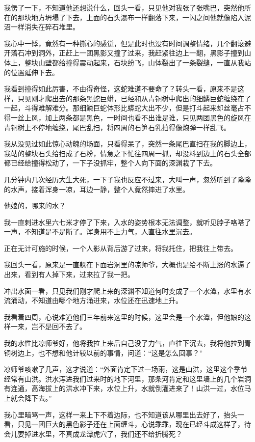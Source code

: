 我愣了一下，不知道他还想说什么，回头一看，只见他对我张了张嘴巴，突然他所在的那块地方坍塌了下去，上面的石头瀑布一样翻落下来，一闪之间他就像陷入泥沼一样消失在碎石堆里。

我心中一悸，竟然有一种撕心的感觉，但是此时也没有时间调整情绪，几个翻滚避开落石冲到洞外，正赶上一团黑影又撞了过来，我赶紧往边上一翻，黑影子撞到山体上，整块山壁都给撞得震动起来，石块纷飞，山体裂出了一条裂缝，一直从我站的位置延伸下去。

我看到撞得如此厉害，不由得奇怪，这蛇难道不要命了？转头一看，原来不是这样，只见刚才爬出去的那条黑蛇巨蟒，已经和从青铜树中爬出的细鳞巨蛇缠绕在了一起，斗得难解难分。那细鳞巨蛇体形比蟒蛇大出不少，但是打斗起来却丝毫占不得一丝上风，加上两条都是黑色，一时间也看不出谁是谁，只见两团黑色的旋风在青铜树上不停地缠绕，尾巴乱扫，将四周的石笋石乳拍得像炮弹一样乱飞。

我从没见过如此惊心动魄的场面，只看得呆了，突然一条尾巴直扫在我的脚边上，我站的整块石头给扫成了石粉，情急之下忙往四周一抓，却没料到边上的石头全部都已经给撞得松动了，一下子没抓牢，整个人向下面的深渊栽了下去。

几分钟内几次经历大生大死，一下子我也反应不过来，大叫一声，忽然听到了隆隆的水声，接着浑身一凉，耳边一静，整个人竟然摔进了水里。

他娘的，哪来的水？

我一直刺进水里六七米才停了下来，入水的姿势根本无法调整，就听见脖子咯嗒了一声，不知道是不是断了。浑身用不上力气，人直往水里沉去。

正在无计可施的时候，一个人影从背后游了过来，将我托住，把我往上带去。

我回头一看，原来是一直躲在下面岩洞里的凉师爷，大概也是给不断上涨的水逼了出来，看到有人掉下来，过来拉了我一把。

冲出水面一看，只见我们刚才爬上来的深渊不知道何时变成了一个水潭，水里有水流涌动，不知道由哪个地方涌进来，水位还在迅速地上升。

我看着四周，心说难道他们三年前来这里的时候，这里会是一个水潭，但他娘的这样一来，岂不是回不去了。

我的水性比凉师爷好，他将我拉上来后自己没了力气，直往下沉去，我将他拉到青铜树边上，也不想和他计较以前的事情，问道：“这是怎么回事？”

凉师爷咳嗽了几声，这才说道：“外面肯定下过一场雨，这是山洪，这里这个季节经常有山洪。洪水泻进我们过来时的地下河里，那条河肯定和这里墙上的几个岩洞有连通，高海拔上的洪水冲下来，水位上升，水就倒灌进来了！山洪一过，水位马上就会降下去。”

我心里暗骂一声，这样一来上下不着边际，也不知道该从哪里出去好了，抬头一看，只见一团巨大的黑色影子还在上面缠斗，心说乖乖，现在已经斗成这样了，待会儿要掉进水里，不真成龙潭虎穴了，我们还不给折腾死？

